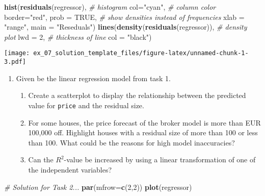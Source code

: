 \documentclass[11pt,]{article}
\newenvironment{Shaded}{\begin{snugshade}}{\end{snugshade}}
\newcommand{\CommentTok}[1]{\textcolor[rgb]{0.56,0.35,0.01}{\textit{#1}}}
\newcommand{\DataTypeTok}[1]{\textcolor[rgb]{0.13,0.29,0.53}{#1}}
\newcommand{\DecValTok}[1]{\textcolor[rgb]{0.00,0.00,0.81}{#1}}
\newcommand{\KeywordTok}[1]{\textcolor[rgb]{0.13,0.29,0.53}{\textbf{#1}}}
\newcommand{\NormalTok}[1]{#1}
\newcommand{\OtherTok}[1]{\textcolor[rgb]{0.56,0.35,0.01}{#1}}
\newcommand{\StringTok}[1]{\textcolor[rgb]{0.31,0.60,0.02}{#1}}
\providecommand{\tightlist}{%
  \setlength{\itemsep}{0pt}\setlength{\parskip}{0pt}}
\begin{document}
\begin{Shaded}
\begin{Highlighting}[]
\KeywordTok{hist}\NormalTok{(}\KeywordTok{residuals}\NormalTok{(regressor), }\CommentTok{# histogram}
     \DataTypeTok{col=}\StringTok{"cyan"}\NormalTok{, }\CommentTok{# column color}
     \DataTypeTok{border=}\StringTok{"red"}\NormalTok{,}
     \DataTypeTok{prob =} \OtherTok{TRUE}\NormalTok{, }\CommentTok{# show densities instead of frequencies}
     \DataTypeTok{xlab =} \StringTok{"range"}\NormalTok{,}
     \DataTypeTok{main =} \StringTok{"Reseduals"}\NormalTok{)}
\KeywordTok{lines}\NormalTok{(}\KeywordTok{density}\NormalTok{(}\KeywordTok{residuals}\NormalTok{(regressor)), }\CommentTok{# density plot}
      \DataTypeTok{lwd =} \DecValTok{2}\NormalTok{, }\CommentTok{# thickness of line}
      \DataTypeTok{col =} \StringTok{"black"}\NormalTok{)}
\end{Highlighting}
\end{Shaded}

\texttt{[image: ex\_07\_solution\_template\_files/figure-latex/unnamed-chunk-1-3.pdf]}

\begin{enumerate}
\def\labelenumi{\arabic{enumi}.}
\setcounter{enumi}{1}
\tightlist
\item
  Given be the linear regression model from task 1.

  \begin{enumerate}
  \def\labelenumii{\alph{enumii})}
  \tightlist
  \item
    Create a scatterplot to display the relationship between the
    predicted value for \texttt{price} and the residual size.
  \item
    For some houses, the price forecast of the broker model is more than
    EUR 100,000 off. Highlight houses with a residual size of more than
    100 or less than 100. What could be the reasons for high model
    inaccuracies?
  \item
    Can the \(R^2\)-value be increased by using a linear transformation
    of one of the independent variables?
  \end{enumerate}
\end{enumerate}

\begin{Shaded}
\begin{Highlighting}[]
\CommentTok{# Solution for Task 2...}
\KeywordTok{par}\NormalTok{(}\DataTypeTok{mfrow=}\KeywordTok{c}\NormalTok{(}\DecValTok{2}\NormalTok{,}\DecValTok{2}\NormalTok{))}
\KeywordTok{plot}\NormalTok{(regressor)}
\end{Highlighting}
\end{Shaded}
\end{document}
